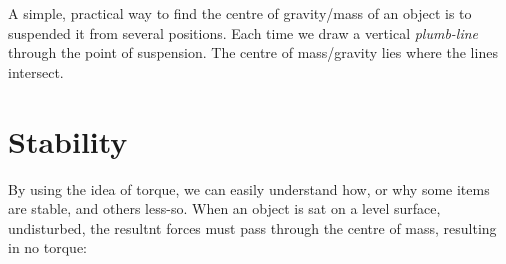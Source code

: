 \documentclass[a4paper,12pt]{book}
\begin{document}
A simple, practical way to find the centre of gravity/mass of an object is to suspended it from several positions. Each time we draw a vertical \emph{plumb-line} through the point of suspension. The centre of mass/gravity lies where the lines intersect.
\section{Stability}

By using the idea of torque, we can easily understand how, or why some items are stable, and others less-so. When an object is sat on a level surface, undisturbed, the resultnt forces must pass through the centre of mass, resulting in no torque:
\def\H{3.1} %
\def\W{1.4} %
\def\R{sqrt(\W^2+\H^2)/2} %
\def\D{0.25} %
\def\ang{atan(\H/\W)} %
\def\angcw{atan2(\H,-\W)} %
\end{document}
